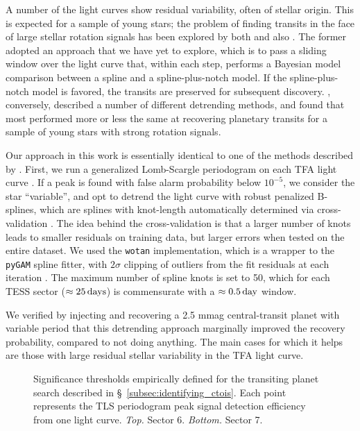 \documentclass[12pt,twocolumn,tighten]{aastex62}
\begin{document}
A number of the light curves show residual variability, often of stellar 
origin.
This is expected for a sample of young stars; the problem of finding transits in 
the face of large stellar rotation signals 
has been explored by both \citet{rizzuto_zeitV_2017} and also 
\citet{hippke_wotan_2019}.
The former adopted an approach that we have yet to explore, which is to 
pass a sliding window over the light curve that, within each step, performs a 
Bayesian model comparison between a spline and a spline-plus-notch model.  If 
the spline-plus-notch model is favored, the transits are preserved for 
subsequent discovery.
\citet{hippke_wotan_2019}, conversely, described a number of different
detrending methods, and found that most performed more or less the same at 
recovering planetary transits for a sample of young stars with strong rotation 
signals.

Our approach in this work is essentially identical to one of the methods 
described by \citet{hippke_wotan_2019}.
First, we run a generalized Lomb-Scargle periodogram on each TFA light 
curve \citep{lomb_1976,scargle_studies_1982,vanderplas_periodograms_2015}.
If a peak is found with false alarm probability below $10^{-5}$, we consider 
the star ``variable'', and opt to 
detrend the light curve with robust penalized B-splines, which are splines 
with knot-length automatically determined via cross-validation 
\citep{eilers_flexible_1996}. The idea behind the cross-validation is that a 
larger  number of knots leads to smaller residuals on training data, but 
larger errors 
when tested on the entire dataset.
We used the \texttt{wotan} implementation, which is a wrapper to the 
\texttt{pyGAM} spline fitter, with $2\sigma$ clipping of outliers from the fit 
residuals at each iteration 
\citep{serven_pygam_2018_1476122,hippke_wotan_2019}.
The maximum number of spline knots is set to 50, which for each TESS sector 
($\approx 25\,{\rm days}$) is commensurate with a $\approx0.5\,{\rm day}$ 
window.

We verified by injecting and recovering a 2.5 mmag central-transit planet
with variable period that this detrending approach marginally improved
the recovery probability, compared to not doing anything.
The main cases for which it helps are those with large residual stellar
variability in the TFA light curve.

\begin{figure}[!t]
    \vspace{-0.8cm}
    \vspace{-0.8cm}
    \caption{
        Significance thresholds empirically defined for the transiting planet 
        search described in \S~\ref{subsec:identifying_ctois}. Each point represents the 
        TLS periodogram peak signal detection efficiency from one light curve.
        {\it Top.} Sector 6.  {\it Bottom.} Sector 7.
    }
    \label{fig:tlsresults}
\end{figure}
\end{document}
